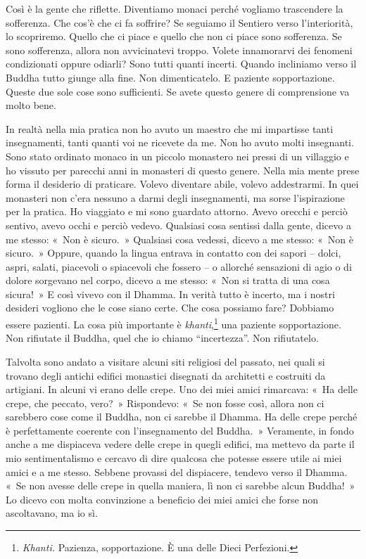 Così è la gente che riflette. Diventiamo monaci perché vogliamo
trascendere la sofferenza. Che cos'è che ci fa soffrire? Se seguiamo il
Sentiero verso l'interiorità, lo scopriremo. Quello che ci piace e
quello che non ci piace sono sofferenza. Se sono sofferenza, allora non
avvicinatevi troppo. Volete innamorarvi dei fenomeni condizionati oppure
odiarli? Sono tutti quanti incerti. Quando incliniamo verso il Buddha
tutto giunge alla fine. Non dimenticatelo. E paziente sopportazione.
Queste due sole cose sono sufficienti. Se avete questo genere di
comprensione va molto bene.

In realtà nella mia pratica non ho avuto un maestro che mi impartisse
tanti insegnamenti, tanti quanti voi ne ricevete da me. Non ho avuto
molti insegnanti. Sono stato ordinato monaco in un piccolo monastero nei
pressi di un villaggio e ho vissuto per parecchi anni in monasteri di
questo genere. Nella mia mente prese forma il desiderio di praticare.
Volevo diventare abile, volevo addestrarmi. In quei monasteri non c'era
nessuno a darmi degli insegnamenti, ma sorse l'ispirazione per la
pratica. Ho viaggiato e mi sono guardato attorno. Avevo orecchi e perciò
sentivo, avevo occhi e perciò vedevo. Qualsiasi cosa sentissi dalla
gente, dicevo a me stesso: «~Non è sicuro.~» Qualsiasi cosa vedessi,
dicevo a me stesso: «~Non è sicuro.~» Oppure, quando la lingua entrava
in contatto con dei sapori -- dolci, aspri, salati, piacevoli o
spiacevoli che fossero -- o allorché sensazioni di agio o di dolore
sorgevano nel corpo, dicevo a me stesso: «~Non si tratta di una cosa
sicura!~» E così vivevo con il Dhamma. In verità tutto è incerto, ma i
nostri desideri vogliono che le cose siano certe. Che cosa possiamo
fare? Dobbiamo essere pazienti. La cosa più importante è
\emph{khanti},\footnote{\emph{Khanti.} Pazienza, sopportazione. È una
  delle Dieci Perfezioni.} una paziente sopportazione. Non rifiutate il
Buddha, quel che io chiamo ``incertezza''. Non rifiutatelo.

Talvolta sono andato a visitare alcuni siti religiosi del passato, nei
quali si trovano degli antichi edifici monastici disegnati da architetti
e costruiti da artigiani. In alcuni vi erano delle crepe. Uno dei miei
amici rimarcava: «~Ha delle crepe, che peccato, vero?~» Rispondevo: «~Se
non fosse così, allora non ci sarebbero cose come il Buddha, non ci
sarebbe il Dhamma. Ha delle crepe perché è perfettamente coerente con
l'insegnamento del Buddha.~» Veramente, in fondo anche a me dispiaceva
vedere delle crepe in quegli edifici, ma mettevo da parte il mio
sentimentalismo e cercavo di dire qualcosa che potesse essere utile ai
miei amici e a me stesso. Sebbene provassi del dispiacere, tendevo verso
il Dhamma. «~Se non avesse delle crepe in quella maniera, lì non ci
sarebbe alcun Buddha!~» Lo dicevo con molta convinzione a beneficio dei
miei amici che forse non ascoltavano, ma io sì.

